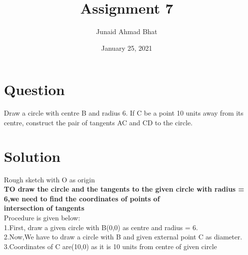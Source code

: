 \documentclass[a4paper,12pt]{article}
\begin{document}
\title{Assignment 7}
\author{Junaid Ahmad Bhat}
\date{January 25, 2021}
\maketitle
\section*{{\small Question}}
Draw a circle with centre B and radius 6. If
C be a point 10 units away from its centre,
construct the pair of tangents AC and CD to
the circle.
\section*{{\small Solution}}

\begin{center}
\end{center}
\hspace*{4cm}Rough sketch with O as origin\\

\textbf{TO draw the circle and the tangents to the given circle with
\hspace*{0.5cm} radius = 6,we need to find the coordinates of points of\\ \hspace*{0.5cm}intersection of tangents}\\
 
Procedure is given below:\\

1.First, draw a given circle with B(0,0) as centre and radius = 6. \\

2.Now,We have to draw a circle with B and given external point C as diameter.\\

3.Coordinates of C are(10,0) as it is 10 units from centre of given circle\\
\end{document}
